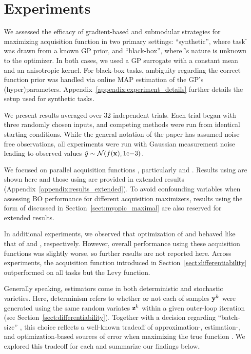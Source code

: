 
\newcommand{\ibudget}{inner budget}
\newcommand{\ibudgets}{inner budgets}


\section{Experiments}
\label{sect:experiments}
We assessed the efficacy of gradient-based and submodular strategies for maximizing acquisition function 
in two primary settings: ``synthetic'', where task \f{} was drawn from a known GP prior, and ``black-box'', where \f's nature is unknown to the optimizer. In both cases, we used a GP surrogate with a constant mean and an anisotropic  kernel. For black-box tasks, ambiguity regarding the correct function prior was handled via online MAP estimation of the GP's (hyper)parameters. Appendix~\ref{appendix:experiment_details} further details the setup used for synthetic tasks.

We present results averaged over 32 independent trials. Each trial began with three randomly chosen inputs, and competing methods were run from identical starting conditions. While the general notation of the paper has assumed noise-free observations, all experiments were run with Gaussian measurement noise leading to observed values \(\hat{y} \sim \mathcal{N}(f(\mathbf{x}), 1\mathrm{e-}3)\).

We focused on parallel \MC acquisition functions \AcqMC{}, particularly \EI{} and \UCB{}.
% 
Results using \EI{} are shown here and those using \UCB{} are provided in extended results (Appendix~\ref{appendix:results_extended}). 
To avoid confounding variables when assessing BO performance for different acquisition maximizers, results using the \mmform{} form of \qEI{} discussed in Section~\ref{sect:myopic_maximal} are also reserved for extended results. 

In additional experiments, we observed that optimization of \PI{} and \SR{} behaved like that of \EI{} and \UCB{}, respectively. However, overall performance using these acquisition functions was slightly worse, so further results are not reported here. Across experiments, the \qUCB{} acquisition function introduced in Section~\ref{sect:differentiability} outperformed \qEI{} on all tasks but the Levy function.

Generally speaking, \MC estimators \AcqMC{} come in both deterministic and stochastic varieties. Here, determinism refers to whether or not each of \nSamples{} samples \(\mathbf{y}^{k}\) were generated using the same random variates \(\mathbf{z}^{k}\) within a given outer-loop iteration (see Section~\ref{sect:differentiability}). 
% 	
Together with a decision regarding ``batch-size'' \nSamples{}, this choice reflects a well-known tradeoff of approximation-, estimation-, and optimization-based sources of error when maximizing the true function \Acq{} \cite{bousquet2008tradeoffs}. We explored this tradeoff for each \solver{} and summarize our findings below.


